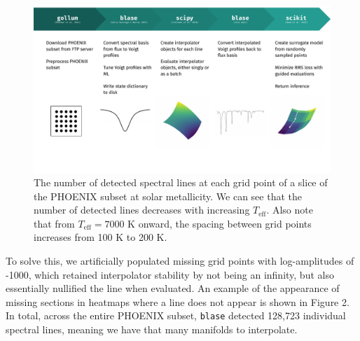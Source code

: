 \documentclass[twocolumn]{aastex631}
\begin{document}
\begin{figure}
    \centering
    \includegraphics[width=\textwidth]{figure1}
    \caption{The number of detected spectral lines at each grid point of 
    a slice of the PHOENIX subset at solar metallicity. We can see that
    the number of detected lines decreases with increasing $T_{\mathrm{eff}}$.
    Also note that from $T_{\mathrm{eff}} = 7000$ K onward, the spacing 
    between grid points increases from 100 K to 200 K.}
\end{figure}

To solve this, we artificially
populated missing grid points with log-amplitudes of -1000, which retained
interpolator stability by not being an infinity, but also essentially 
nullified the line when evaluated. An example of the appearance of missing 
sections in heatmaps where a line does not appear is shown in Figure 2. 
In total, across the entire PHOENIX subset, \texttt{blase} detected 
128,723 individual spectral lines, meaning we have that many manifolds to 
interpolate.
\end{document}
